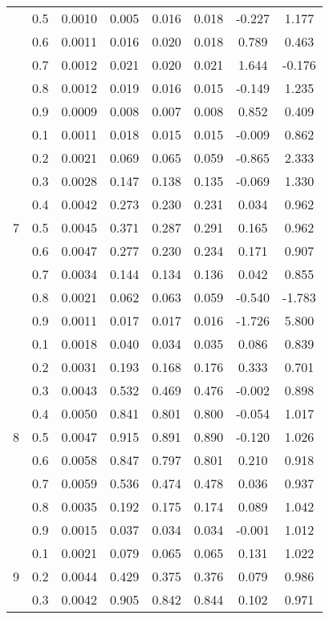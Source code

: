 \documentclass[11pt,a4paper]{report}
\begin{document}
\begin{longtable}{ | c | c || c | c | c | c | c | c | }
 & 0.5 & 0.0010 & 0.005 & 0.016 & 0.018 & -0.227 & 1.177 \\
 & 0.6 & 0.0011 & 0.016 & 0.020 & 0.018 & 0.789 & 0.463 \\
 & 0.7 & 0.0012 & 0.021 & 0.020 & 0.021 & 1.644 & -0.176 \\
 & 0.8 & 0.0012 & 0.019 & 0.016 & 0.015 & -0.149 & 1.235 \\
 & 0.9 & 0.0009 & 0.008 & 0.007 & 0.008 & 0.852 & 0.409 \\
 \hline
\multirow{9}{*}{7} & 0.1 & 0.0011 & 0.018 & 0.015 & 0.015 & -0.009 & 0.862 \\
 & 0.2 & 0.0021 & 0.069 & 0.065 & 0.059 & -0.865 & 2.333 \\
 & 0.3 & 0.0028 & 0.147 & 0.138 & 0.135 & -0.069 & 1.330 \\
 & 0.4 & 0.0042 & 0.273 & 0.230 & 0.231 & 0.034 & 0.962 \\
 & 0.5 & 0.0045 & 0.371 & 0.287 & 0.291 & 0.165 & 0.962 \\
 & 0.6 & 0.0047 & 0.277 & 0.230 & 0.234 & 0.171 & 0.907 \\
 & 0.7 & 0.0034 & 0.144 & 0.134 & 0.136 & 0.042 & 0.855 \\
 & 0.8 & 0.0021 & 0.062 & 0.063 & 0.059 & -0.540 & -1.783 \\
 & 0.9 & 0.0011 & 0.017 & 0.017 & 0.016 & -1.726 & 5.800 \\
 \hline
\multirow{9}{*}{8} & 0.1 & 0.0018 & 0.040 & 0.034 & 0.035 & 0.086 & 0.839 \\
 & 0.2 & 0.0031 & 0.193 & 0.168 & 0.176 & 0.333 & 0.701 \\
 & 0.3 & 0.0043 & 0.532 & 0.469 & 0.476 & -0.002 & 0.898 \\
 & 0.4 & 0.0050 & 0.841 & 0.801 & 0.800 & -0.054 & 1.017 \\
 & 0.5 & 0.0047 & 0.915 & 0.891 & 0.890 & -0.120 & 1.026 \\
 & 0.6 & 0.0058 & 0.847 & 0.797 & 0.801 & 0.210 & 0.918 \\
 & 0.7 & 0.0059 & 0.536 & 0.474 & 0.478 & 0.036 & 0.937 \\
 & 0.8 & 0.0035 & 0.192 & 0.175 & 0.174 & 0.089 & 1.042 \\
 & 0.9 & 0.0015 & 0.037 & 0.034 & 0.034 & -0.001 & 1.012 \\
 \hline
\multirow{9}{*}{9} & 0.1 & 0.0021 & 0.079 & 0.065 & 0.065 & 0.131 & 1.022 \\
 & 0.2 & 0.0044 & 0.429 & 0.375 & 0.376 & 0.079 & 0.986 \\
 & 0.3 & 0.0042 & 0.905 & 0.842 & 0.844 & 0.102 & 0.971 \\

\end{longtable}
\end{document}
